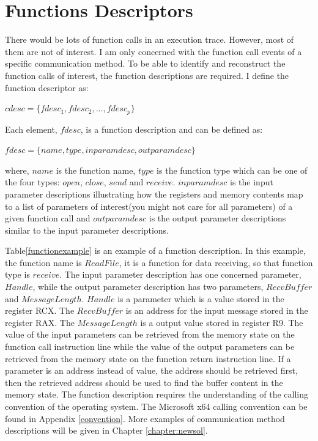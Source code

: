 \section{Functions Descriptors}\label{cdesc}
There would be lots of function calls in an execution trace. However, most of them are not of interest. I am only concerned with the function call events of a specific communication method. To be able to identify and reconstruct the function calls of interest, the function descriptions are required. I define the function descriptor as:

$cdesc = \lbrace fdesc_1, fdesc_2,...,fdesc_p \rbrace$

Each element, $fdesc$, is a function description and can be defined as:

$fdesc = \lbrace name, type, inparamdesc, outparamdesc \rbrace$

where, $name$ is the function name, $type$ is the function type which can be one of the four types: $open$, $close$, $send$ and $receive$. $inparamdesc$ is the input parameter descriptions illustrating how the registers and memory contents map to a list of parameters of interest(you might not care for all parameters) of a given function call and $outparamdesc$ is the output parameter descriptions similar to the input parameter descriptions. 

Table\ref{functionexample} is an example of a function description. In this example, the function name is $ReadFile$, it is a function for data receiving, so that function type is $receive$. The input parameter description has one concerned parameter, $Handle$, while the output parameter description has two parameters, $RecvBuffer$ and $MessageLength$. $Handle$ is a parameter which is a value stored in the register RCX. The $RecvBuffer$ is an address for the input message stored in the register RAX. The $MessageLength$ is a output value stored in register R9. The value of the input parameters can be retrieved from the memory state on the function call instruction line while the value of the output parameters can be retrieved from the memory state on the function return instruction line. If a parameter is an address instead of value, the address should be retrieved first, then the retrieved address should be used to find the buffer content in the memory state. The function description requires the understanding of the calling convention of the operating system. The Microsoft x64 calling convention can be found in Appendix \ref{convention}. More examples of communication method descriptions will be given in Chapter \ref{chapter:newsol}.

